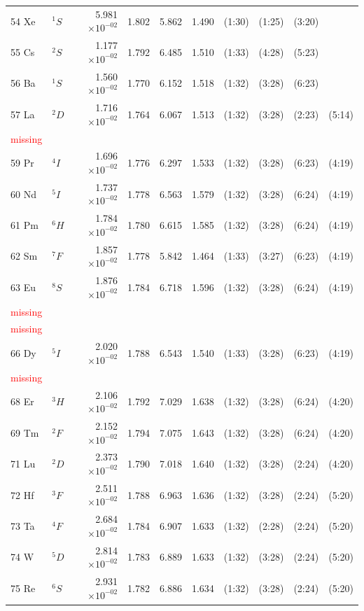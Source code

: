 \documentclass[12pt]{report}
\newcommand{\notetodylan}[1]{\textcolor{red}{#1}} %
\begin{document}
\begin{longtable}{l l r r r r r r r r}
54 Xe & $^{1}S$ & 5.981$\times10^{-02}$ & 1.802 & 5.862 & 1.490 & (1:30) & (1:25) & (3:20)   \\
55 Cs & $^{2}S$ & 1.177$\times10^{-02}$ & 1.792 & 6.485 & 1.510 & (1:33) & (4:28) & (5:23)   \\
56 Ba & $^{1}S$ & 1.560$\times10^{-02}$ & 1.770 & 6.152 & 1.518 & (1:32) & (3:28) & (6:23)   \\
57 La & $^{2}D$ & 1.716$\times10^{-02}$ & 1.764 & 6.067 & 1.513 & (1:32) & (3:28) & (2:23) & (5:14) \\
\notetodylan{missing}	\\
59 Pr & $^{4}I$ & 1.696$\times10^{-02}$ & 1.776 & 6.297 & 1.533 & (1:32) & (3:28) & (6:23) & (4:19) \\
60 Nd & $^{5}I$ & 1.737$\times10^{-02}$ & 1.778 & 6.563 & 1.579 & (1:32) & (3:28) & (6:24) & (4:19) \\
61 Pm & $^{6}H$ & 1.784$\times10^{-02}$ & 1.780 & 6.615 & 1.585 & (1:32) & (3:28) & (6:24) & (4:19) \\
62 Sm & $^{7}F$ & 1.857$\times10^{-02}$ & 1.778 & 5.842 & 1.464 & (1:33) & (3:27) & (6:23) & (4:19) \\
63 Eu & $^{8}S$ & 1.876$\times10^{-02}$ & 1.784 & 6.718 & 1.596 & (1:32) & (3:28) & (6:24) & (4:19) \\
\notetodylan{missing}	\\
\notetodylan{missing}	\\
66 Dy & $^{5}I$ & 2.020$\times10^{-02}$ & 1.788 & 6.543 & 1.540 & (1:33) & (3:28) & (6:23) & (4:19) \\
\notetodylan{missing}	\\
68 Er & $^{3}H$ & 2.106$\times10^{-02}$ & 1.792 & 7.029 & 1.638 & (1:32) & (3:28) & (6:24) & (4:20) \\
69 Tm & $^{2}F$ & 2.152$\times10^{-02}$ & 1.794 & 7.075 & 1.643 & (1:32) & (3:28) & (6:24) & (4:20) \\
71 Lu & $^{2}D$ & 2.373$\times10^{-02}$ & 1.790 & 7.018 & 1.640 & (1:32) & (3:28) & (2:24) & (4:20) \\
72 Hf & $^{3}F$ & 2.511$\times10^{-02}$ & 1.788 & 6.963 & 1.636 & (1:32) & (3:28) & (2:24) & (5:20) \\
73 Ta & $^{4}F$ & 2.684$\times10^{-02}$ & 1.784 & 6.907 & 1.633 & (1:32) & (2:28) & (2:24) & (5:20) \\
74 W & $^{5}D$ & 2.814$\times10^{-02}$ & 1.783 & 6.889 & 1.633 & (1:32) & (3:28) & (2:24) & (5:20) \\
75 Re & $^{6}S$ & 2.931$\times10^{-02}$ & 1.782 & 6.886 & 1.634 & (1:32) & (3:28) & (2:24) & (5:20) \\

\end{longtable}
\end{document}
